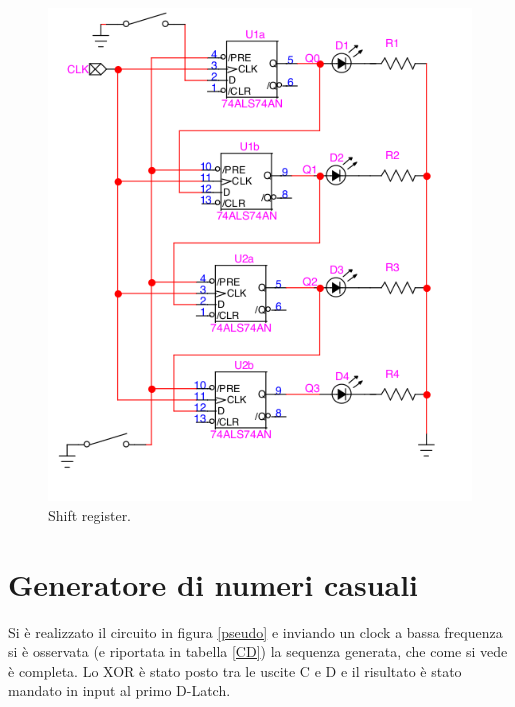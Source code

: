 \documentclass[10pt,a4paper]{article}
\begin{document}
\begin{figure}
\centering
\includegraphics[scale=0.5]{shift.png}
\caption{Shift register.\label{shift}}
\end{figure}

\section{Generatore di numeri casuali}
Si è realizzato il circuito in figura \ref{pseudo} e inviando un clock a bassa frequenza si è osservata (e riportata in tabella \ref{CD}) la sequenza generata, che come si vede è completa. 
Lo XOR è stato posto tra le uscite C e D e il risultato è stato mandato in input al primo  D-Latch.\\
\end{document}
